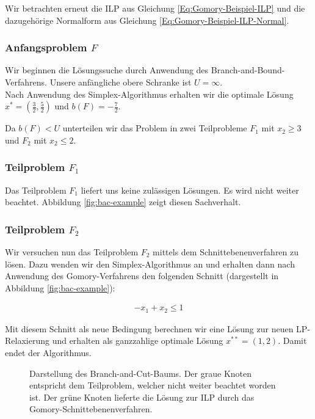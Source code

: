 \documentclass[tog]{acmsiggraph}
\begin{document}
Wir betrachten erneut die ILP aus Gleichung \ref{Eq:Gomory-Beispiel-ILP} und die dazugehörige Normalform aus Gleichung \ref{Eq:Gomory-Beispiel-ILP-Normal}.\\

\subsubsection*{Anfangsproblem $F$}

Wir beginnen die Lösungssuche durch Anwendung des Branch-and-Bound-Verfahrens. Unsere anfängliche obere Schranke ist $U = \infty$.\\
Nach Anwendung des Simplex-Algorithmus erhalten wir die optimale Lösung $x^* = (\frac{3}{2}, \frac{5}{2})$ und $b(F) = - \frac{7}{2}$.

Da $b(F) < U$ unterteilen wir das Problem in zwei Teilprobleme $F_1$ mit $x_2 \geq 3$ und $F_2$ mit $x_2 \leq 2$.

\subsubsection*{Teilproblem $F_1$}

Das Teilproblem $F_1$ liefert uns keine zulässigen Lösungen. Es wird nicht weiter beachtet. Abbildung \ref{fig:bac-example} zeigt diesen Sachverhalt.

\subsubsection*{Teilproblem $F_2$}

Wir versuchen nun das Teilproblem $F_2$ mittels dem Schnittebenenverfahren zu lösen. Dazu wenden wir den Simplex-Algorithmus an und erhalten dann nach Anwendung des Gomory-Verfahrens den folgenden Schnitt (dargestellt in Abbildung \ref{fig:bac-example}): 

\large
\begin{align}
\label{Eq:Branch-and-Cut-Schnitt}
- x_1 + x_2 \leq 1
\end{align}
\normalsize

Mit diesem Schnitt als neue Bedingung berechnen wir eine Lösung zur neuen LP-Relaxierung und erhalten als ganzzahlige optimale Lösung $x^{**} = (1, 2)$. Damit endet der Algorithmus.



\begin{figure}[ht]
\centering
{}
\caption{Darstellung des Branch-and-Cut-Baums. Der graue Knoten entspricht dem Teilproblem, welcher nicht weiter beachtet worden ist. Der grüne Knoten lieferte die Lösung zur ILP durch das Gomory-Schnittebenenverfahren.}
\label{fig:Branch-And-Cut-Baum}
\end{figure}
\end{document}

